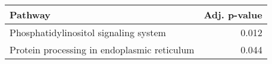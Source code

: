 \begin{tabular}{lr}
\toprule
                                     Pathway &  Adj. p-value \\
\midrule
       Phosphatidylinositol signaling system &         0.012 \\
 Protein processing in endoplasmic reticulum &         0.044 \\
\bottomrule
\end{tabular}
